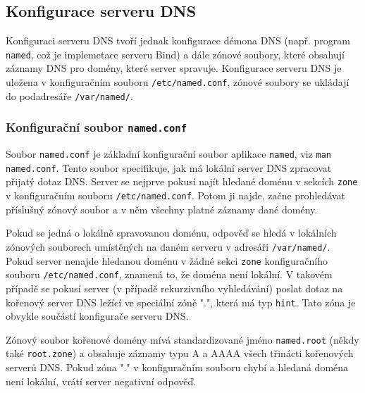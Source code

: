 \subsection{Konfigurace serveru DNS}
Konfiguraci serveru DNS tvoří jednak konfigurace démona DNS (např. program {\tt named}, což je implemetace serveru Bind) a dále zónové soubory, které obsahují záznamy DNS pro domény, které server spravuje. Konfigurace serveru DNS je uložena v konfiguračním souboru {\tt /etc/named.conf}, zónové soubory se ukládají do podadresáře {\tt /var/named/}. 

\subsubsection{Konfigurační soubor {\tt named.conf}}
Soubor {\tt named.conf} je základní konfigurační soubor aplikace {\tt named}, viz {\tt man named.conf}. Tento soubor specifikuje, jak má lokální server DNS zpracovat přijatý dotaz DNS. Server se nejprve pokusí najít hledané doménu v sekcích {\tt zone} v konfiguračním souboru {\tt /etc/named.conf}. Potom ji najde, začne prohledávat příslušný zónový soubor a v něm všechny platné záznamy dané domény. 

Pokud se jedná o lokálně spravovanou doménu, odpověď se hledá v lokálních zónových souborech umístěných na daném serveru v adresáři {\tt /var/named/}. Pokud server nenajde hledanou doménu v žádné sekci {\tt zone} konfiguračního souboru {\tt /etc/named.conf}, znamená to, že doména není lokální. V takovém případě se pokusí server (v případě rekurzivního vyhledávání) poslat dotaz  na kořenový server DNS ležící ve speciální zóně ".", která má typ {\tt hint}. Tato zóna je obvykle součástí konfigurače serveru DNS.

Zónový soubor kořenové domény mívá standardizované jméno {\tt named.root} (někdy také {\tt root.zone}) a obsahuje záznamy typu A a AAAA všech třinácti kořenových serverů DNS. Pokud zóna "." v konfiguračním souboru chybí a hledaná doména není lokální, vrátí server negativní odpověď.

